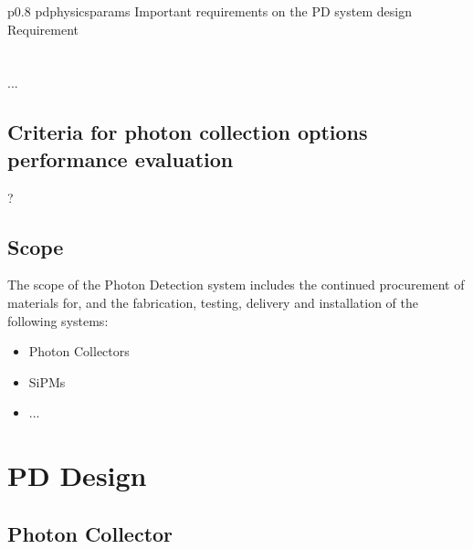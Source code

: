 \begin{dunetable}
{p{0.8\textwidth}}
{pdphysicsparams}
{Important requirements on the PD system design}   
Requirement  \\ \toprowrule
  \\ \colhline
   \\ \colhline
 ...\\ 
\end{dunetable}


\subsection{Criteria for photon collection options performance evaluation}?


\subsection{Scope}
\label{sec:fdsp-pd-scope}

The scope of the Photon Detection system includes the continued procurement of materials for, and the fabrication, testing, delivery and installation of the following systems: 


\begin{itemize}
\item Photon Collectors 
\item SiPMs
\item ...
\end{itemize}



\section{PD Design}
\label{sec:fdsp-pd-design}



\subsection{Photon Collector}
\label{sec:fdsp-pd-pc}

